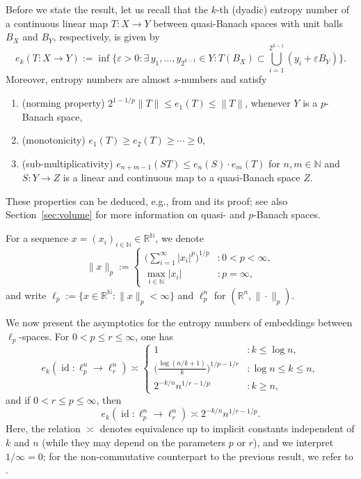 \documentclass[a4paper,12pt]{article}
\theoremstyle{definition}
\newcommand{\IN}{\mathbb{N}}
\newcommand{\IR}{\mathbb{R}}
\DeclareMathOperator{\id}{id}
\begin{document}
Before we state the result, let us recall that the $k$-th (dyadic) entropy number of a continuous linear map $T\colon X\to Y$ between quasi-Banach spaces with unit balls $B_X$ and $B_Y$, respectively, is given by
\[
e_k(T\colon X\to Y):=\inf\Bigg\{\varepsilon>0 \colon \exists\, y_1,\dots,y_{2^{k-1}}\in Y \colon T(B_X)\subset \bigcup_{i=1}^{2^{k-1}} (y_i+\varepsilon B_Y)\Bigg\}.
\]
Moreover, entropy numbers are almost $s$-numbers and satisfy
\begin{enumerate}
	\item (norming property) $2^{1-1/p}\|T\|\le e_1(T)\le \|T\|$, whenever $Y$ is a $p$-Banach space,
	\item (monotonicity) $e_1(T)\ge e_2(T)\ge \cdots \ge 0$,
	\item (sub-multiplicativity) $e_{n+m-1}(ST)\le e_n(S)\cdot e_m(T)$ for $n,m\in\IN$ and $S\colon Y\to Z$ is a linear and continuous map to a quasi-Banach space $Z$.
\end{enumerate}
These properties can be deduced, e.g.,  from \cite[Lemma 1.3.1.1]{ET96} and its proof; see also Section~\ref{sec:volume} for more information on quasi- and $p$-Banach spaces. 

 For a sequence $x=(x_i)_{i\in\IN}\in\IR^{\IN}$, we denote
\[
\|x\|_p:=
\begin{cases}
	\displaystyle\bigg(\sum_{i=1}^{\infty}|x_i|^p\bigg)^{1/p}&\colon 0<p<\infty,\\
	\displaystyle\max_{i\in \IN}|x_i|&\colon  p=\infty,
\end{cases}
\]
and write $\ell_p:=\{x\in\IR^{\IN}\colon \|x\|_p<\infty\}$ and $\ell_p^n$ for $(\IR^n,\|\cdot\|_p)$.  


We now present the asymptotics for the entropy numbers of embeddings between $\ell_p$-spaces.  For $0 < p\le r\le \infty$, one has \begin{equation} \label{eq:classical-p-le-r}
e_k(\id\colon \ell_p^n\to \ell_r^n)
\asymp
\begin{cases}
	1 &\colon k\le \log n,\\
	\Big(\frac{\log(n/k+1)}{k}\Big)^{1/p-1/r}&\colon  \log n\le k\le n,\\
	2^{-k/n}n^{1/r-1/p}&\colon k\ge n,
\end{cases}
\end{equation}
and if $0< r\le p\le \infty$, then
\begin{equation}\label{eq:classical-p-ge-r}
e_k(\id\colon \ell_p^n\to \ell_r^n)
\asymp 2^{-k/n}n^{1/r-1/p}.
\end{equation}
Here, the relation $\asymp$ denotes equivalence up to implicit constants independent of $k$ and $n$ (while they may depend on the parameters $p$ or $r$), and we interpret $1/\infty=0$; for the non-commutative counterpart
to the previous result, we refer to \cite{HPV2017}. 
\end{document}
